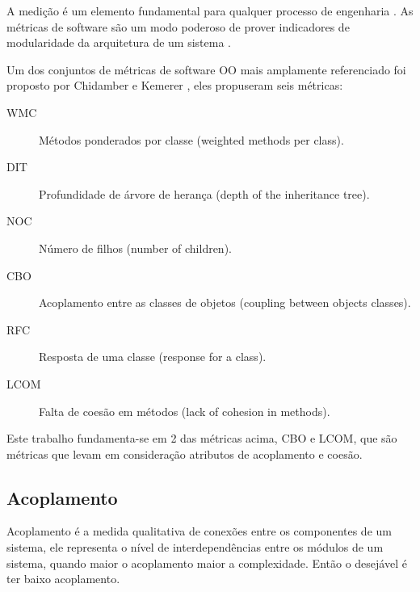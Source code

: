 A medição é um elemento fundamental para qualquer processo de engenharia
\cite{engenhariaDeSoftwarePressman}. As métricas de software são um modo
poderoso de prover indicadores de modularidade da arquitetura de um sistema
\cite{OntheModular}.

Um dos conjuntos de métricas de software OO
mais amplamente referenciado foi proposto por Chidamber e Kemerer
\cite{engenhariaDeSoftwarePressman}, eles propuseram seis métricas:

\begin{description}

\item[WMC]
Métodos ponderados por classe (weighted methods per class).

\item[DIT]
Profundidade de árvore de herança (depth of the inheritance tree).

\item[NOC]
Número de filhos (number of children).

\item[CBO]
Acoplamento entre as classes de objetos (coupling between objects classes).

\item[RFC]
Resposta de uma classe (response for a class).

\item[LCOM]
Falta de coesão em métodos (lack of cohesion in methods).

\end{description}

Este trabalho fundamenta-se em 2 das métricas acima, CBO e LCOM, que são
métricas que levam em consideração atributos de acoplamento e coesão.

\subsection{Acoplamento}

Acoplamento é a medida qualitativa de conexões entre os componentes de um
sistema, ele representa o nível de interdependências entre os módulos de um
sistema, quando maior o acoplamento maior a complexidade. Então o desejável é
ter baixo acoplamento.


